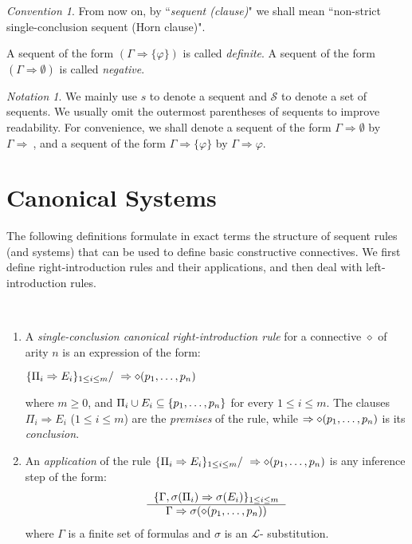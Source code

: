 \documentclass{LMCS}
\theoremstyle{remark}
\newtheorem*{notation}{Notation}
\newtheorem*{convention}{Convention}
\newcommand{\lp}{\mathcal{L}}
\newcommand{\Ss}{\mathcal{S}}
\newcommand{\dd}{\diamond}
\newcommand{\ptil}{p_1 \til p_n}
\newcommand{\be}{\begin{enumerate}[(1)]}
\newcommand{\ee}{\end{enumerate}}
\newcommand{\Ra}{\Rightarrow}
\newcommand{\g}{\Gamma}
\newcommand{\fe}{\varphi}
\newcommand{\suq}{\subseteq}
\newcommand{\dera}[2]{
    \begin{tabular}{c}
    $ #1 $ \\ \hline
    $ #2 $ \\
\end{tabular}}
\begin{document}
\begin{convention}
From now on, by ``{\em sequent (clause)}" we shall mean 
``non-strict single-conclusion sequent (Horn clause)".
\end{convention}

\begin{defi} 
A sequent of the form $(\g\Ra\{\fe\})$ is called {\em definite}.  
A sequent of the form $(\g\Ra\emptyset)$ is called {\em negative}.
\end{defi}

\begin{notation}
We mainly use $s$ to denote a sequent and $\Ss$ to denote a set of sequents.
We usually omit the outermost parentheses of sequents to improve readability.
For convenience, we shall denote a sequent of the form $\g\Ra\emptyset$ by $\g\Ra\ $,
and a sequent of the form $\g\Ra\{\fe\}$ by $\g\Ra\fe$.
\end{notation}

\section{Canonical Systems}

The following definitions formulate in exact terms the structure of 
sequent rules (and systems) that can be used to define basic constructive connectives.
We first define right-introduction rules and their applications, and then deal with left-introduction rules.

\begin{defi}
\label{canonical right-introduction rule}
\
\be
\item
A {\em  single-conclusion canonical right-introduction rule} for a connective $\diamond$ of arity $n$
is an expression of the form:
\begin{center}
${\{\Pi_i \Ra E_i\}_{1 \leq i \leq m} / \  \Ra \dd(\ptil)}$
\end{center}
\sloppy
\noindent
where
$m\geq 0$, and ${\Pi_i\cup E_i \suq \{\ptil\}}$
for every  $1 \leq i \leq m$.
The clauses 
$\Pi_i \Ra E_i$ ($1 \leq i \leq m$) are the {\em premises} of the rule,
while  ${\Ra \dd(\ptil)}$ is its {\em conclusion}. \item An {\em application} of the rule
$\{\Pi_i \Ra E_i\}_{1 \leq i \leq m} / \ \Ra \dd(\ptil)$
is any inference step of the form:
\[\dera{\{\g,\sigma(\Pi_i)\Ra \sigma(E_i) \}_{1 \leq i \leq m}}
{\g\Ra \sigma(\dd(\ptil))}\]
where $\g$ is a finite set of formulas and $\sigma$ is an $\lp$- substitution.
\ee
\end{defi}
\end{document}
